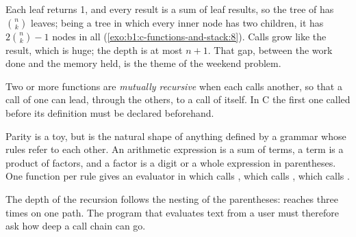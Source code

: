 Each leaf returns 1, and every result is a sum of leaf results, so the tree of  has
$\binom{n}{k}$ leaves; being a tree in which every inner node has two children, it has $2\binom{n}{k} - 1$ nodes in
all (\cref{exo:b1:c-functions-and-stack:8}). Calls grow like the result, which is huge; the depth is at most $n+1$.
That gap, between the work done and the memory held, is the theme of the weekend problem.

\begin{definition}\label{def:b1:c-functions-and-stack:mutual}
Two or more functions are \emph{mutually recursive} when each calls another, so that a call
of one can lead, through the others, to a call of itself. In C the first one called before its definition must be
declared beforehand.
\end{definition}

\label{lst:b1:c-functions-and-stack:even-odd}


Parity is a toy, but  is the natural shape of anything defined by a grammar whose rules refer to
each other. An arithmetic expression is a sum of terms, a term is a product of factors, and a factor is a digit or
a whole expression in parentheses. One function per rule gives an evaluator in which  calls
, which calls , which calls .

\label{lst:b1:c-functions-and-stack:evaluator}

\label{out:b1:c-functions-and-stack:calc}

The depth of the recursion follows the nesting of the parentheses:  reaches  three
times on one path. The program that evaluates text from a user must therefore ask how deep a call chain can go.

